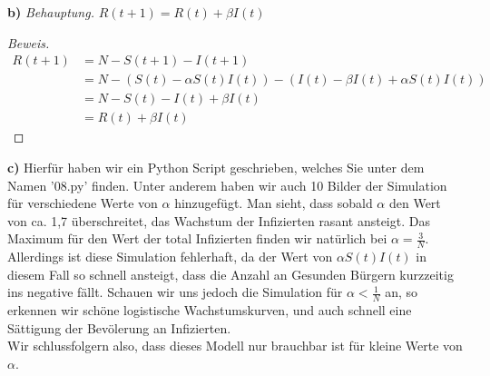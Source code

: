 \documentclass[a4paper]{article}
\newcommand{\beh}{\textit{Behauptung. }}
\begin{document}
\textbf{b)} \beh $R(t+1) = R(t) + \beta I(t)$

\begin{proof}[Beweis]
	\begin{align*}
		R(t+1) &= N - S(t+1) - I(t+1) \\
			   &= N - \left(
				   S(t) - \alpha S(t) I(t)
			   \right) - \left(
			   I(t) - \beta I(t) + \alpha S(t) I(t)
			   \right) \\
			   &= N - S(t) - I(t) + \beta I(t) \\
			   &= R(t) + \beta I(t)
	\end{align*}
\end{proof}

\textbf{c)} Hierfür haben wir ein Python Script geschrieben, welches Sie unter dem Namen '08.py' finden.
Unter anderem haben wir auch 10 Bilder der Simulation für verschiedene Werte von $\alpha$
hinzugefügt. Man sieht, dass sobald $\alpha$ den Wert von ca. 1,7 überschreitet, das Wachstum
der Infizierten rasant ansteigt. Das Maximum für den Wert der total Infizierten finden
wir natürlich bei $\alpha = \frac{ 3 }{ N }$. Allerdings ist diese Simulation fehlerhaft,
da der Wert von $\alpha S(t) I(t)$ in diesem Fall so schnell ansteigt, dass
die Anzahl an Gesunden Bürgern kurzzeitig ins negative fällt.
Schauen wir uns jedoch die Simulation für $\alpha < \frac{ 1 }{ N }$ an, so erkennen wir
schöne logistische Wachstumskurven, und auch schnell eine Sättigung der Bevölerung
an Infizierten.
\\

Wir schlussfolgern also, dass dieses Modell nur brauchbar ist für kleine Werte von $\alpha$.
\end{document}
